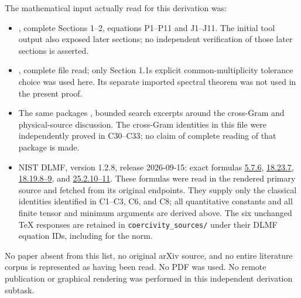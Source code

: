 \documentclass[11pt]{article}
\providecommand{\tightlist}{\setlength{\itemsep}{0pt}\setlength{\parskip}{0pt}}
\begin{document}
The mathematical input actually read for this derivation was:

\begin{itemize}
\tightlist
\item
  , complete Sections 1--2, equations P1--P11 and J1--J11. The initial tool output also exposed later sections; no independent verification of those later sections is asserted.
\item
  , complete file read; only Section 1.1\textquotesingle s explicit common-multiplicity tolerance choice was used here. Its separate imported spectral theorem was not used in the present proof.
\item
  The same package\textquotesingle s , bounded search excerpts around the cross-Gram and physical-source discussion. The cross-Gram identities in this file were independently proved in C30--C33; no claim of complete reading of that package is made.
\item
  NIST DLMF, version 1.2.8, release 2026-09-15: exact formulas \href{https://dlmf.nist.gov/5.7.E6}{5.7.6}, \href{https://dlmf.nist.gov/18.23.E7}{18.23.7}, \href{https://dlmf.nist.gov/18.19.E8}{18.19.8--9}, and \href{https://dlmf.nist.gov/25.2.E10}{25.2.10--11}. These formulas were read in the rendered primary source and fetched from its original  endpoints. They supply only the classical identities identified in C1--C3, C6, and C8; all quantitative constants and all finite tensor and minimum arguments are derived above. The six unchanged TeX responses are retained in \texttt{coercivity\_sources/} under their DLMF equation IDs, including  for the norm.
\end{itemize}

No paper absent from this list, no original arXiv source, and no entire literature corpus is represented as having been read. No PDF was used. No remote publication or graphical rendering was performed in this independent derivation subtask.
\end{document}
